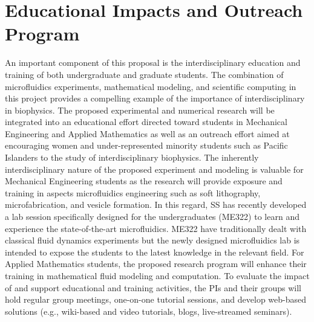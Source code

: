 \documentclass[11pt]{article}
\begin{document}
\vspace*{-7pt}
\section{Educational Impacts and Outreach Program}
\label{sec:Educational_plans}
\vspace*{-7pt}

An important component of this proposal is the interdisciplinary
education and training of both undergraduate and graduate students. The
combination of microfluidics experiments, mathematical modeling, and
scientific computing in this project provides a compelling example of
the importance of interdisciplinary in biophysics. The proposed
experimental and numerical research will be integrated into an
educational effort directed toward students in Mechanical Engineering
and Applied Mathematics as well as an outreach effort aimed at
encouraging women and under-represented minority students such as
Pacific Islanders to the study of interdisciplinary biophysics. The
inherently interdisciplinary nature of the proposed experiment and
modeling is valuable for Mechanical Engineering students as the research
will provide exposure and training in aspects microfluidics engineering
such as soft lithography, microfabrication, and vesicle formation. In
this regard, SS has recently developed a lab session specifically
designed for the undergraduates (ME322) to learn and experience the
state-of-the-art microfluidics. ME322 have traditionally dealt with
classical fluid dynamics experiments but the newly designed
microfluidics lab is intended to expose the students to the latest
knowledge in the relevant field.  For Applied Mathematics students, the
proposed research program will enhance their training in mathematical
fluid modeling and computation. To evaluate the impact of and support
educational and training activities, the PIs and their groups will hold
regular group meetings, one-on-one tutorial sessions, and develop
web-based solutions (e.g., wiki-based and video tutorials, blogs,
live-streamed seminars).
\end{document}
